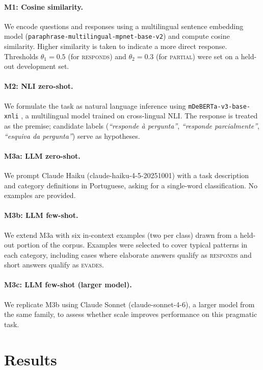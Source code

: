 \documentclass[11pt]{article}
\begin{document}
\paragraph{M1: Cosine similarity.}
We encode questions and responses using a multilingual sentence embedding model (\texttt{paraphrase-multilingual-mpnet-base-v2}) \cite{reimers2019sentence} and compute cosine similarity. Higher similarity is taken to indicate a more direct response. Thresholds $\theta_1 = 0.5$ (for \textsc{responds}) and $\theta_2 = 0.3$ (for \textsc{partial}) were set on a held-out development set.

\paragraph{M2: NLI zero-shot.}
We formulate the task as natural language inference using \texttt{mDeBERTa-v3-base-xnli} \cite{laurer2022mDeBERTa}, a multilingual model trained on cross-lingual NLI. The response is treated as the premise; candidate labels (\textit{``responde à pergunta''}, \textit{``responde parcialmente''}, \textit{``esquiva da pergunta''}) serve as hypotheses.

\paragraph{M3a: LLM zero-shot.}
We prompt Claude Haiku (claude-haiku-4-5-20251001) with a task description and category definitions in Portuguese, asking for a single-word classification. No examples are provided.

\paragraph{M3b: LLM few-shot.}
We extend M3a with six in-context examples (two per class) drawn from a held-out portion of the corpus. Examples were selected to cover typical patterns in each category, including cases where elaborate answers qualify as \textsc{responds} and short answers qualify as \textsc{evades}.

\paragraph{M3c: LLM few-shot (larger model).}
We replicate M3b using Claude Sonnet (claude-sonnet-4-6), a larger model from the same family, to assess whether scale improves performance on this pragmatic task.

\section{Results}
\end{document}
